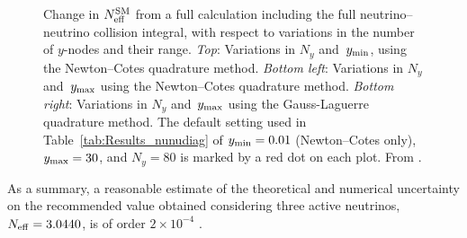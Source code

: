 \documentclass[notitlepage,nofootinbib,showpacs,preprintnumbers,amsmath,amssymb,superscriptaddress,prd,onecolumn]{revtex4-1}
\newcommand{\Neff}{\ensuremath{N_{\rm eff}}}
\begin{document}
\begin{figure}[t]
\begin{center}
\begin{subfigure}{.49\textwidth}
\end{subfigure}
\end{center}
\caption{Change in $\Neff^{\rm SM}$ from a full calculation including the full neutrino--neutrino collision integral, with respect to variations in the number of $y$-nodes and their range.
{\it Top}: Variations in $N_y$ and~$y_{\rm min}$, using the Newton--Cotes quadrature method.
{\it Bottom left}: Variations in $N_y$ and~$y_{\rm max}$ using the Newton--Cotes quadrature method.
{\it Bottom right}: Variations in $N_y$ and~$y_{\rm max}$ using the Gauss-Laguerre quadrature method.
The default setting used in Table~\ref{tab:Results_nunudiag} of $y_{\rm min}=0.01$ (Newton--Cotes only), $y_{\rm max}=30$, and $N_y = 80$ is marked by a red dot on each plot.
From \cite{Bennett:2020zkv}.
\label{fig:Ny_yrange}}
\end{figure}

As a summary, a reasonable estimate of the theoretical and numerical uncertainty on the recommended value
obtained considering three active neutrinos,
$\Neff=3.0440$,
is of order $2\times10^{-4}$ \cite{Bennett:2020zkv}.
\end{document}
